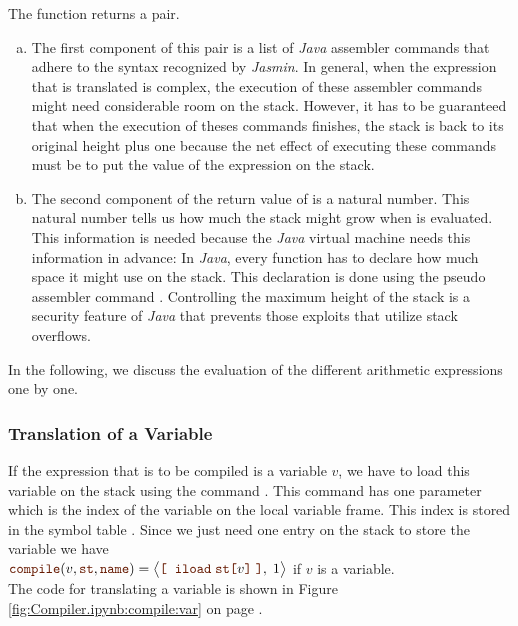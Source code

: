 The function  returns a pair.  
\begin{enumerate}[(a)]
\item The first component of this pair is a list of \textsl{Java} 
      assembler commands that adhere to the syntax recognized by \textsl{Jasmin}.  In general, when the
      expression that is translated is complex, the execution of these assembler commands might need
      considerable room on the stack.  However, it has to be guaranteed that when the execution of theses
      commands finishes, the stack is back to its original height plus one because the net 
      effect of executing these commands must be to put the value of the expression on the stack.
\item The second component of the return value of  is a natural number.
      This natural number tells us how much the stack might grow when  is evaluated.
      This information is needed because the \textsl{Java} virtual machine needs this information in advance:
      In \textsl{Java}, every function has to declare how much space it might use on the stack.
      This declaration is done using the pseudo assembler command .  Controlling the 
      maximum height of the stack is a security feature of \textsl{Java} that prevents those exploits that
      utilize stack overflows.
\end{enumerate}
In the following, we discuss the evaluation of the different arithmetic expressions one by one.


\subsubsection{Translation of a Variable}
If the expression that is to be compiled is a variable $v$, we have to load this variable on the stack using
the command .  This command has one parameter which is the index of the variable on the local
variable frame.  This index is stored in the symbol table .  Since we just need one entry on the
stack to store the variable we have
\\[0.2cm]
\hspace*{1.3cm}
$\mytt{compile}(v, \mytt{st}, \mytt{name}) = 
 \bigl\langle\mytt{[}\;\; \mytt{iload}\; \mytt{st[}v\mytt{]}\; \mytt{]}, \; 1\bigr\rangle$ \quad
 if $v$ is a variable.
\\[0.2cm]
The code for translating a variable is shown in Figure \ref{fig:Compiler.ipynb:compile:var} on page
\pageref{fig:Compiler.ipynb:compile:var}.

